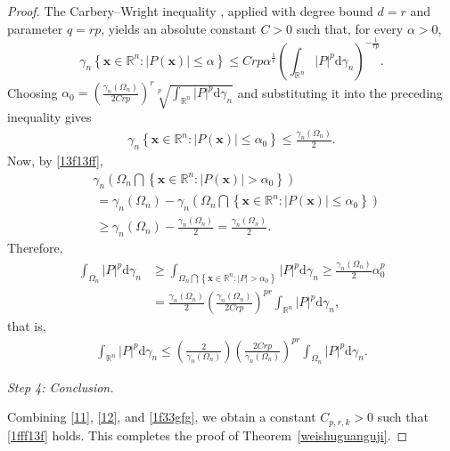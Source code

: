 \documentclass[12pt]{article}
\theoremstyle{plain}
\theoremstyle{definition}
\theoremstyle{remark}
\numberwithin{equation}{section}
\begin{document}
\begin{proof}
The Carbery--Wright inequality \cite[Theorem~8, p.~244]{CW}, applied with degree bound $d=r$ and parameter $q=rp$, yields an absolute constant $C>0$ such that, for every $\alpha>0$,
$$\gamma_{n} \left\{ \textbf{x} \in \mathbb{R}^{n} :\left| P\left( \textbf{x} \right) \right| \leqslant \alpha \right\} \leqslant Crp\alpha^{\frac{1}{r}} \left( \int_{\mathbb{R}^{n}} \left| P \right|^{p} \mathrm{d} \gamma_{n} \right)^{-\frac{1}{rp}}.$$
Choosing $\alpha_0 =\left( \frac{\gamma_{{}n} \left( \Omega_{n} \right)}{2Crp} \right)^{r} \sqrt[p]{\int_{\mathbb{R}^{n}} \left| P \right|^{p} \mathrm{d} \gamma_{n}}$ and substituting it into the preceding inequality gives
\begin{eqnarray}
	\gamma_{n} \left\{ \textbf{x} \in \mathbb{R}^{n} :\left| P\left( \textbf{x} \right) \right| \leqslant \alpha_{0} \right\} \leqslant \frac{\gamma_{{}n} \left( \Omega_{n} \right)}{2}.\label{13f13ff}
\end{eqnarray}
Now, by \eqref{13f13ff},
$$\begin{aligned}
	&\gamma_{n} \left( \Omega_{n} \bigcap \left\{ \textbf{x} \in \mathbb{R}^{n} :\left| P\left( \textbf{x} \right) \right| >\alpha_{0} \right\} \right)\\ &\  =\gamma_{n} \left( \Omega_{n} \right) -\gamma_{n} \left( \Omega_{n} \bigcap \left\{ \textbf{x} \in \mathbb{R}^{n} :\left| P\left( \textbf{x} \right) \right| \leqslant \alpha_{0} \right\} \right)\\ &\  \geqslant \gamma_{n} \left( \Omega_{n} \right) -\frac{\gamma_{n} \left( \Omega_{n} \right)}{2} =\frac{\gamma_{n} \left( \Omega_{n} \right)}{2} .\end{aligned}$$
Therefore,
$$\begin{aligned}\int_{\Omega_{n}} \left| P \right|^{p} \mathrm{d} \gamma_{n}&\geqslant \int_{\Omega_{n} \bigcap \left\{ \textbf{x} \in \mathbb{R}^{n} :\left| P \right| >\alpha_{0} \right\}} \left| P \right|^{p} \mathrm{d} \gamma_{n} \geqslant \frac{\gamma_{{}n} \left( \Omega_{n} \right)}{2} \alpha_{0}^{p}\\ &=\frac{\gamma_{{}n} \left( \Omega_{n} \right)}{2} \left( \frac{\gamma_{{}n} \left( \Omega_{n} \right)}{2Crp} \right)^{pr} \int_{\mathbb{R}^{n}} \left| P \right|^{p} \mathrm{d} \gamma_{n} ,\end{aligned}$$
that is,
\begin{eqnarray}
\int_{\mathbb{R}^{n}} \left| P \right|^{p} \mathrm{d} \gamma_{n} \leqslant \left( \frac{2}{\gamma_{n} \left( \Omega_{n} \right)} \right) \left( \frac{2Crp}{\gamma_{n} \left( \Omega_{n} \right)} \right)^{pr} \int_{\Omega_{n}} \left| P \right|^{p} \mathrm{d} \gamma_{n}.\label{1f33gfg}
\end{eqnarray}

\medskip\noindent\textit{Step 4: Conclusion.}

Combining \eqref{11}, \eqref{12}, and \eqref{1f33gfg}, we obtain a constant $C_{p,r,k}>0$ such that \eqref{1fff13f} holds. This completes the proof of Theorem~\ref{weishuguanguji}.

\end{proof}
\end{document}
